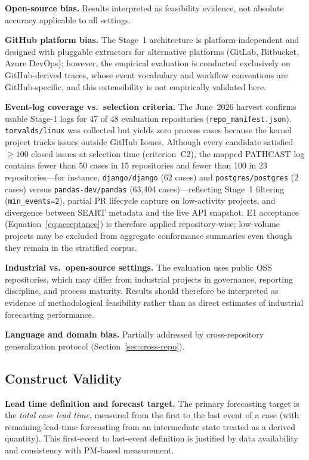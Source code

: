 \textbf{Open-source bias.} Results interpreted as feasibility evidence,
not absolute accuracy applicable to all settings.

\textbf{GitHub platform bias.} The Stage~1 architecture is
platform-independent and designed with pluggable extractors for alternative
platforms (GitLab, Bitbucket, Azure DevOps); however, the empirical
evaluation is conducted exclusively on GitHub-derived traces, whose
event vocabulary and workflow conventions are GitHub-specific, and this
extensibility is not empirically validated here.

\textbf{Event-log coverage vs.\ selection criteria.} The June~2026 harvest
confirms usable Stage-1 logs for 47 of 48 evaluation repositories
(\texttt{repo\_manifest.json}). \texttt{torvalds/linux} was collected but
yields zero process cases because the kernel project tracks issues outside
GitHub Issues. Although every candidate satisfied $\geq 100$ closed issues at
selection time (criterion~C2), the mapped PATHCAST log contains fewer than
50 cases in 15 repositories and fewer than 100 in 23 repositories---for
instance, \texttt{django/django} (62 cases) and \texttt{postgres/postgres}
(2 cases) versus \texttt{pandas-dev/pandas} (63{,}404 cases)---reflecting
Stage~1 filtering (\texttt{min\_events=2}), partial PR lifecycle capture on
low-activity projects, and divergence between SEART metadata and the live
API snapshot. E1 acceptance (Equation~\eqref{eq:acceptance}) is therefore
applied repository-wise; low-volume projects may be excluded from aggregate
conformance summaries even though they remain in the stratified corpus.

\textbf{Industrial vs.\ open-source settings.} The evaluation uses public
OSS repositories, which may differ from industrial projects in governance,
reporting discipline, and process maturity. Results should therefore be
interpreted as evidence of methodological feasibility rather than as direct
estimates of industrial forecasting performance.

\textbf{Language and domain bias.} Partially addressed by cross-repository
generalization protocol (Section~\ref{sec:cross-repo}).


\subsection{Construct Validity}
\label{sec:threats-construct}

\textbf{Lead time definition and forecast target.} The primary forecasting
target is the \emph{total case lead time}, measured from the first to the
last event of a case (with remaining-lead-time forecasting from an
intermediate state treated as a derived quantity). This first-event to
last-event definition is justified by data availability and consistency with
PM-based measurement.

